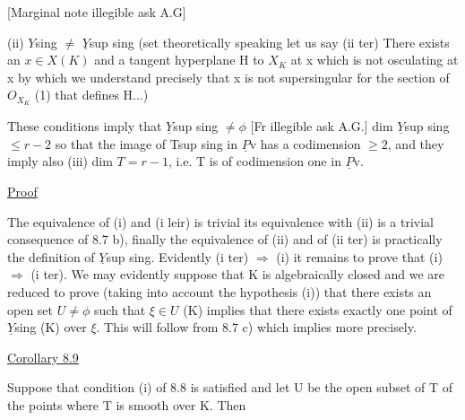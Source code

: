 
[Marginal note illegible ask A.G]\hand{*}

(ii) $Y$sing $\neq$ $\underline{Y}$sup sing (set theoretically speaking let us say
(ii ter) There exists an $x \in X(K)$ and a tangent hyperplane H to $X_{K}$
at x which is not osculating at x by which we understand precisely
that x is not supersingular for the section of $O_{X_{K}}$ (1) that defines
H...)

These conditions imply that $\underline{Y}$sup sing $\neq \phi$ [Fr illegible ask
A.G.] dim $\underline{Y}$sup sing $\leq r - 2$ so that the image of Tsup sing in $\underline{P}$v has a
codimension $\geq 2$, and they imply also (iii) dim $T = r - 1$, i.e. T
is of codimension one in $\underline{P}$v.

\uline{Proof}

The equivalence of (i) and (i leir) is trivial its
equivalence with (ii) is a trivial consequence of 8.7 b), finally
the equivalence of (ii) and of (ii ter) is practically the
definition of $\underline{Y}$sup sing. Evidently (i ter) $\Rightarrow$ (i) it remains to
prove that (i) $\Rightarrow$ (i ter). We may evidently suppose that K is
algebraically closed and we are reduced to prove (taking into
account the hypothesis (i)) that there exists an open set $U \neq \phi$
such that $\xi \in U$ (K) implies that there exists exactly one point of
$\underline{Y}$sing (K) over $\xi$. This will follow from 8.7 c) which implies more
precisely.

\uline{Corollary 8.9}

Suppose that condition (i) of 8.8 is satisfied and let U be
the open subset of T of the points where T is smooth over K. Then

